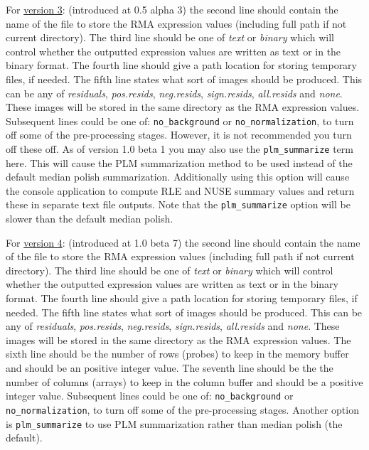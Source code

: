 \documentclass[11pt]{report}
\begin{document}
For \underline{version 3}: (introduced at 0.5 alpha 3) the second line should contain the name of the file to store the RMA expression values (including full path if not current directory). The third line should be one of {\it text} or {\it binary} which will control whether the outputted expression values are written as text or in the binary format. The fourth line should give a path location for storing temporary files, if needed. The fifth line states what sort of images should be produced. This can be any of {\it residuals},  {\it pos.resids}, {\it neg.resids}, {\it sign.resids}, {\it all.resids} and {\it none}. These images will be stored in the same directory as the RMA expression values. Subsequent lines could be one of: {\tt no\_background} or {\tt no\_normalization}, to turn off some of the pre-processing stages. However, it is not recommended you turn off these off. As of version 1.0 beta 1 you may also use the {\tt plm\_summarize} term here. This will cause the PLM summarization method to be used instead of the default median polish summarization. Additionally using this option will cause the console application to compute RLE and NUSE summary values and return these in separate text file outputs. Note that the {\tt plm\_summarize} option will be slower than the default median polish.

For \underline{version 4}: (introduced at 1.0 beta 7) the second line should contain the name of the file to store the RMA expression values (including full path if not current directory). The third line should be one of {\it text} or {\it binary} which will control whether the outputted expression values are written as text or in the binary format. The fourth line should give a path location for storing temporary files, if needed. The fifth line states what sort of images should be produced. This can be any of {\it residuals},  {\it pos.resids}, {\it neg.resids}, {\it sign.resids}, {\it all.resids} and {\it none}. These images will be stored in the same directory as the RMA expression values. The sixth line should be the number of rows (probes) to keep in the memory buffer and should be an positive integer value. The seventh line should be the the number of columns (arrays) to keep in the column buffer and should be a positive integer value.  Subsequent lines could be one of: {\tt no\_background} or {\tt no\_normalization}, to turn off some of the pre-processing stages. Another option is {\tt plm\_summarize} to use PLM summarization rather than median polish (the default).
\end{document}

